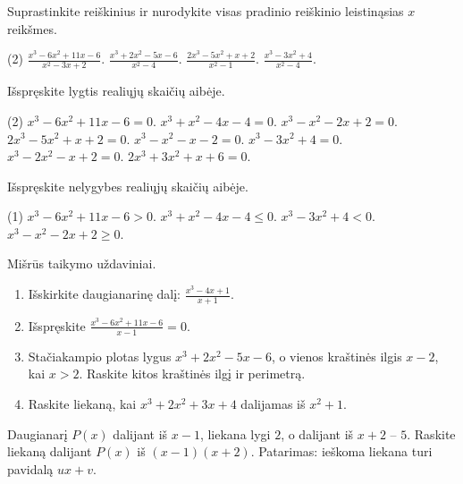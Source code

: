 \documentclass[11pt,a4paper]{scrartcl}
\newcommand{\uzd}[1]{\Needspace{5\baselineskip}\begin{problem}#1\end{problem}}
\begin{document}
\clearpage
\uzd{Suprastinkite reiškinius ir nurodykite visas pradinio reiškinio leistinąsias \(x\) reikšmes.
\begin{tasks}(2)
\task \(\displaystyle\frac{x^3-6x^2+11x-6}{x^2-3x+2}\).
\task \(\displaystyle\frac{x^3+2x^2-5x-6}{x^2-4}\).
\task \(\displaystyle\frac{2x^3-5x^2+x+2}{x^2-1}\).
\task \(\displaystyle\frac{x^3-3x^2+4}{x^2-4}\).
\end{tasks}}
\uzd{Išspręskite lygtis realiųjų skaičių aibėje.
\begin{tasks}(2)
\task \(x^3-6x^2+11x-6=0\).
\task \(x^3+x^2-4x-4=0\).
\task \(x^3-x^2-2x+2=0\).
\task \(2x^3-5x^2+x+2=0\).
\task \(x^3-x^2-x-2=0\).
\task \(x^3-3x^2+4=0\).
\task \(x^3-2x^2-x+2=0\).
\task \(2x^3+3x^2+x+6=0\).
\end{tasks}}
\uzd{Išspręskite nelygybes realiųjų skaičių aibėje.
\begin{tasks}(1)
\task \(x^3-6x^2+11x-6>0\).
\task \(x^3+x^2-4x-4\le0\).
\task \(x^3-3x^2+4<0\).
\task \(x^3-x^2-2x+2\ge0\).
\end{tasks}}
\uzd{Mišrūs taikymo uždaviniai.
\begin{enumerate}[label=(\arabic*),leftmargin=*,itemsep=.4em]
\item Išskirkite daugianarinę dalį: \(\displaystyle\frac{x^3-4x+1}{x+1}\).
\item Išspręskite \(\displaystyle\frac{x^3-6x^2+11x-6}{x-1}=0\).
\item Stačiakampio plotas lygus \(x^3+2x^2-5x-6\), o vienos kraštinės ilgis \(x-2\), kai \(x>2\). Raskite kitos kraštinės ilgį ir perimetrą.
\item Raskite liekaną, kai \(x^3+2x^2+3x+4\) dalijamas iš \(x^2+1\).
\end{enumerate}}
\begin{remark*}
Daugianarį \(P(x)\) dalijant iš \(x-1\), liekana lygi \(2\), o dalijant iš \(x+2\) -- \(5\). Raskite liekaną dalijant \(P(x)\) iš \((x-1)(x+2)\). Patarimas: ieškoma liekana turi pavidalą \(ux+v\).
\end{remark*}
\end{document}
